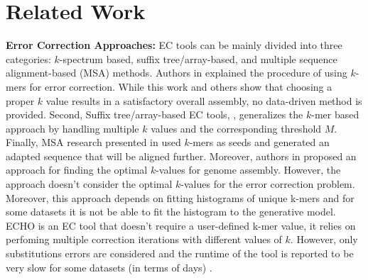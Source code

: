 \vspace{-12pt}
\section{Related Work}
\vspace{-12pt}
\textbf{Error Correction Approaches:} EC tools can be mainly divided into three categories: $k$-spectrum based, suffix tree/array-based, and multiple sequence alignment-based (MSA) methods. Authors in \cite{pevzner2001eulerian} explained the procedure of using $k$-mers for error correction. %
While this work and others show that choosing a proper $k$ value results in a satisfactory overall assembly, no data-driven method is provided. Second, Suffix tree/array-based EC tools, \eg \cite{ilie2010hitec}, generalizes the $k$-mer based approach by handling multiple $k$ values and the corresponding threshold $M$. Finally, MSA research presented in \cite{salmela2011correcting} used $k$-mers as seeds and generated an adapted sequence that will be aligned further. Moreover, authors in \cite{chikhi2013informed} proposed an approach for finding the optimal $k$-values for genome assembly. However, the approach doesn't consider the optimal $k$-values for the error correction problem. Moreover, this approach depends on fitting histograms of unique k-mers and for some datasets it is not be able to fit the histogram to the generative model. ECHO \cite{kao2011echo} is an EC tool that doesn't require a user-defined k-mer value, it relies on perfoming multiple correction iterations with different values of $k$. However, only substitutions errors are considered and the runtime of the tool is reported to be very slow for some datasets (in terms of days) \cite{yang2012survey}. %
